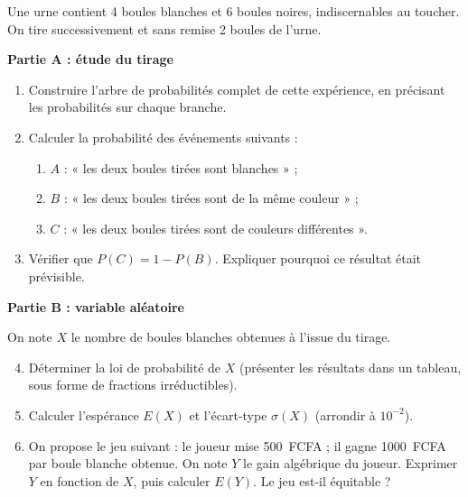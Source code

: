 \documentclass[11pt]{article}
\newcounter{popsec}
\newcounter{popsub}
\newcommand{\courssub}[1]{%
  \stepcounter{popsub}%
  \par\vspace{9pt}\noindent{\popxbold\fontsize{11.5}{13}\selectfont\color{popink}{\color{poporange}\thepopsec.\thepopsub}\hspace{6pt}#1}\par\nopagebreak\vspace{4pt}
}
\begin{document}
\courssub{Je me prépare au Bac}

\begin{exercice}
Une urne contient 4 boules blanches et 6 boules noires, indiscernables au toucher. On tire successivement et sans remise 2 boules de l'urne.

\textbf{Partie A : étude du tirage}
\begin{enumerate}
\item Construire l'arbre de probabilités complet de cette expérience, en précisant les probabilités sur chaque branche.
\item Calculer la probabilité des événements suivants :
\begin{enumerate}
\item $A$ : « les deux boules tirées sont blanches » ;
\item $B$ : « les deux boules tirées sont de la même couleur » ;
\item $C$ : « les deux boules tirées sont de couleurs différentes ».
\end{enumerate}
\item Vérifier que $P(C)=1-P(B)$. Expliquer pourquoi ce résultat était prévisible.
\end{enumerate}

\textbf{Partie B : variable aléatoire}

On note $X$ le nombre de boules blanches obtenues à l'issue du tirage.
\begin{enumerate}
\setcounter{enumi}{3}
\item Déterminer la loi de probabilité de $X$ (présenter les résultats dans un tableau, sous forme de fractions irréductibles).
\item Calculer l'espérance $E(X)$ et l'écart-type $\sigma(X)$ (arrondir à $10^{-2}$).
\item On propose le jeu suivant : le joueur mise \SI{500}{FCFA} ; il gagne \SI{1000}{FCFA} par boule blanche obtenue. On note $Y$ le gain algébrique du joueur. Exprimer $Y$ en fonction de $X$, puis calculer $E(Y)$. Le jeu est-il équitable ?
\end{enumerate}
\end{exercice}
\end{document}
